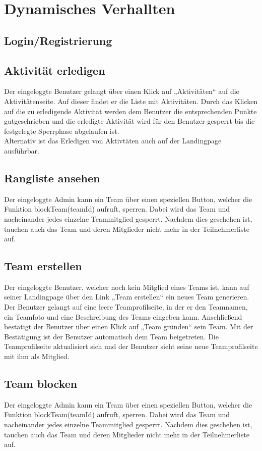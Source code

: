 ﻿\section{Dynamisches Verhallten}
\subsection{Login/Registrierung}
\subsection{Aktivität erledigen}
Der eingeloggte Benutzer gelangt über einen Klick auf „Aktivitäten“ auf die Aktivitätenseite. Auf dieser findet er die Liste mit Aktivitäten. Durch das Klicken auf die zu erledigende Aktivität werden dem Benutzer die entsprechenden Punkte gutgeschrieben und die erledigte Aktivität wird für den Benutzer gesperrt bis die festgelegte Sperrphase abgelaufen ist.\\
Alternativ ist das Erledigen von Aktivtäten auch auf der Landingpage ausführbar.\\
\subsection{Rangliste ansehen}
Der eingeloggte Admin kann ein Team über einen speziellen Button, welcher die Funktion blockTeam(teamId) aufruft, sperren. Dabei wird das Team und nacheinander jedes einzelne Teammitglied gesperrt. Nachdem dies geschehen ist, tauchen auch das Team und deren Mitglieder nicht mehr in der Teilnehmerliste auf.\\
\subsection{Team erstellen}
Der eingeloggte Benutzer, welcher noch kein Mitglied eines Teams ist, kann auf seiner Landingpage über den Link „Team erstellen“ ein neues Team generieren. Der Benutzer gelangt auf eine leere Teamprofilseite, in der er den Teamnamen, ein Teamfoto und eine Beschreibung des Teams eingeben kann. Anschließend bestätigt der Benutzer über einen Klick auf „Team gründen“ sein Team. Mit der Bestätigung ist der Benutzer automatisch dem Team beigetreten. Die Teamprofilseite aktualisiert sich und der Benutzer sieht seine neue Teamprofilseite mit ihm als Mitglied.\\
\subsection{Team blocken}
Der eingeloggte Admin kann ein Team über einen speziellen Button, welcher die Funktion blockTeam(teamId) aufruft, sperren. Dabei wird das Team und nacheinander jedes einzelne Teammitglied gesperrt. Nachdem dies geschehen ist, tauchen auch das Team und deren Mitglieder nicht mehr in der Teilnehmerliste auf.\\
